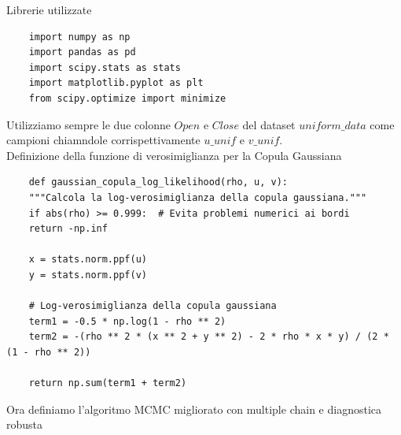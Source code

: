 \documentclass[%
	corpo=11pt,
    twoside,
    stile=classica,
    oldstyle,
    tipotesi=custom,
    greek,
    evenboxes,
]{toptesi}
\begin{document}
Librerie utilizzate
\begin{verbatim}
	import numpy as np
	import pandas as pd
	import scipy.stats as stats
	import matplotlib.pyplot as plt
	from scipy.optimize import minimize
\end{verbatim}
Utilizziamo sempre le due colonne $Open$ e $Close$ del dataset $uniform\_data$ come campioni chiamndole corrispettivamente $u\_unif$ e $v\_unif$.\\

Definizione della funzione di verosimiglianza per la Copula Gaussiana
\begin{verbatim}
	def gaussian_copula_log_likelihood(rho, u, v):
	"""Calcola la log-verosimiglianza della copula gaussiana."""
	if abs(rho) >= 0.999:  # Evita problemi numerici ai bordi
	return -np.inf
	
	x = stats.norm.ppf(u)
	y = stats.norm.ppf(v)
	
	# Log-verosimiglianza della copula gaussiana
	term1 = -0.5 * np.log(1 - rho ** 2)
	term2 = -(rho ** 2 * (x ** 2 + y ** 2) - 2 * rho * x * y) / (2 * (1 - rho ** 2))
	
	return np.sum(term1 + term2)
\end{verbatim}
Ora definiamo l'algoritmo MCMC migliorato con multiple chain e diagnostica robusta
\end{document}
